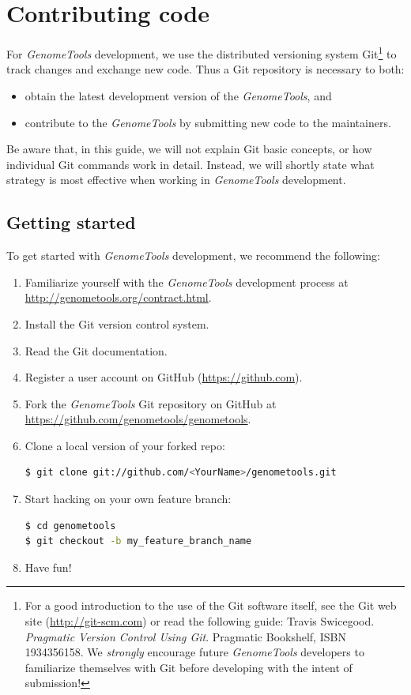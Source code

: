 \documentclass[11pt,final]{article}
\newcommand{\Gt}[0]{\emph{GenomeTools}\xspace}
\begin{document}
\section{Contributing code}

For \Gt development, we use the distributed versioning system Git\footnote{For
a good introduction to the use of the Git software itself, see the Git web site
(\url{http://git-scm.com}) or read the following guide:
Travis Swicegood. \emph{Pragmatic Version Control Using Git}.
Pragmatic Bookshelf, ISBN 1934356158. We \emph{strongly} encourage future \Gt
developers to familiarize themselves with Git before developing with the intent
of submission!} to track changes and
exchange new code. Thus a Git repository is necessary to both:

\begin{itemize}
\item
obtain the latest development version of the \Gt , and
\item
contribute to the \Gt by submitting new code to the maintainers.
\end{itemize}

Be aware that, in this guide, we will not explain Git basic concepts, or how
individual Git commands work in detail. Instead, we will shortly state what
strategy is most effective when working in \Gt development.

\subsection{Getting started}
To get started with \Gt development, we recommend the following:
\begin{enumerate}
  \item Familiarize yourself with the \Gt development process at \url{http://genometools.org/contract.html}.
  \item Install the Git version control system.
  \item Read the Git documentation.
  \item Register a user account on GitHub (\url{https://github.com}).
  \item Fork the \Gt Git repository on GitHub at \url{https://github.com/genometools/genometools}.
  \item Clone a local version of your forked repo:
    \begin{lstlisting}[language=sh]
$ git clone git://github.com/<YourName>/genometools.git
    \end{lstlisting}%
  \item Start hacking on your own feature branch:
    \begin{lstlisting}[language=sh]
$ cd genometools
$ git checkout -b my_feature_branch_name
    \end{lstlisting}
 \item Have fun!
\end{enumerate}
\end{document}

